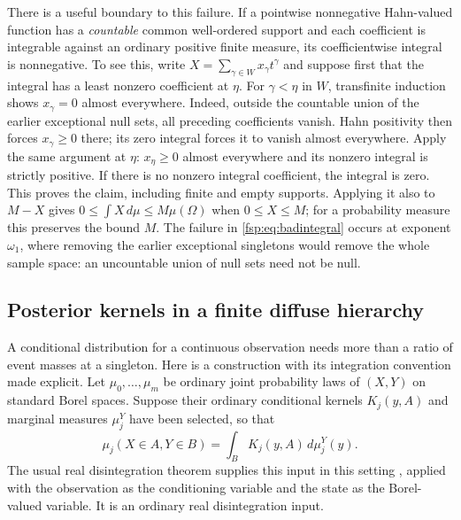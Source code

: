 \documentclass[11pt,a4paper]{article}
\numberwithin{equation}{section}
\theoremstyle{definition}
\theoremstyle{remark}
\begin{document}
There is a useful boundary to this failure. If a pointwise nonnegative
Hahn-valued function has a \emph{countable} common well-ordered support
and each coefficient is integrable against an ordinary positive finite
measure, its coefficientwise integral is nonnegative. To see this,
write $X=\sum_{\gamma\in W}x_\gamma t^\gamma$ and suppose
first that the integral has a least nonzero coefficient at $\eta$.
For $\gamma<\eta$ in $W$, transfinite induction shows
$x_\gamma=0$ almost everywhere. Indeed, outside the countable union
of the earlier exceptional null sets, all preceding coefficients vanish.
Hahn positivity then forces $x_\gamma\ge0$ there; its zero integral
forces it to vanish almost everywhere. Apply the same argument at
$\eta$: $x_\eta\ge0$ almost everywhere and its nonzero integral
is strictly positive. If there is no nonzero integral coefficient, the
integral is zero. This proves the claim, including finite and empty
supports. Applying it also to $M-X$ gives
$0\le\int X\,d\mu\le M\mu(\Omega)$ when $0\le X\le M$;
for a probability measure this preserves the bound $M$. The failure in \eqref{fsp:eq:badintegral}
occurs at exponent $\omega_1$, where removing the earlier exceptional
singletons would remove the whole sample space: an uncountable union
of null sets need not be null.

\subsection{Posterior kernels in a finite diffuse hierarchy}
\label{fsp:subsec:kernels}

A conditional distribution for a continuous observation needs more than
a ratio of event masses at a singleton. Here is a construction with its
integration convention made explicit. Let
$\mu_0,\ldots,\mu_m$ be ordinary joint probability laws of $(X,Y)$ on
standard Borel spaces. Suppose their ordinary conditional kernels
$K_j(y,A)$ and marginal measures $\mu_j^Y$ have been selected, so that
\begin{equation}
 \mu_j(X\in A,Y\in B)=\int_B K_j(y,A)\,d\mu_j^Y(y).
\end{equation}
The usual real disintegration theorem supplies this input in this
setting \cite[Theorem~8.5]{kallenberg}, applied with the observation
as the conditioning variable and the state as the Borel-valued variable.
It is an ordinary real disintegration input.
\end{document}
